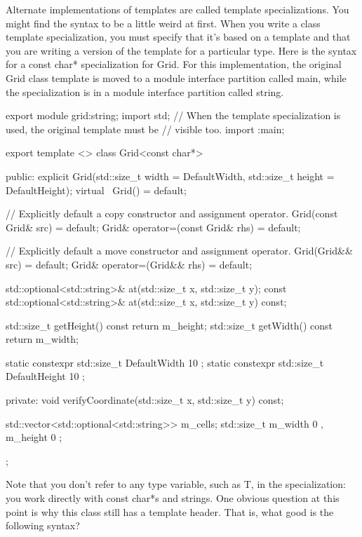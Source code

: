 Alternate implementations of templates are called template specializations. You might find the syntax to be a little weird at first. When you write a class template specialization, you must specify that it’s based on a template and that you are writing a version of the template for a particular type. Here is the syntax for a const char* specialization for Grid. For this implementation, the original Grid class template is moved to a module interface partition called main, while the specialization is in a module interface partition called string.


\begin{cpp}
export module grid:string;
import std;
// When the template specialization is used, the original template must be
// visible too.
import :main;

export template <>
class Grid<const char*>
{
    public:
        explicit Grid(std::size_t width = DefaultWidth,
            std::size_t height = DefaultHeight);
        virtual ~Grid() = default;

        // Explicitly default a copy constructor and assignment operator.
        Grid(const Grid& src) = default;
        Grid& operator=(const Grid& rhs) = default;

        // Explicitly default a move constructor and assignment operator.
        Grid(Grid&& src) = default;
        Grid& operator=(Grid&& rhs) = default;

        std::optional<std::string>& at(std::size_t x, std::size_t y);
        const std::optional<std::string>& at(std::size_t x, std::size_t y) const;

        std::size_t getHeight() const { return m_height; }
        std::size_t getWidth() const { return m_width; }

        static constexpr std::size_t DefaultWidth { 10 };
        static constexpr std::size_t DefaultHeight { 10 };

    private:
        void verifyCoordinate(std::size_t x, std::size_t y) const;

        std::vector<std::optional<std::string>> m_cells;
        std::size_t m_width { 0 }, m_height { 0 };
};
\end{cpp}

Note that you don’t refer to any type variable, such as T, in the specialization: you work directly with const char*s and strings. One obvious question at this point is why this class still has a template header. That is, what good is the following syntax?

